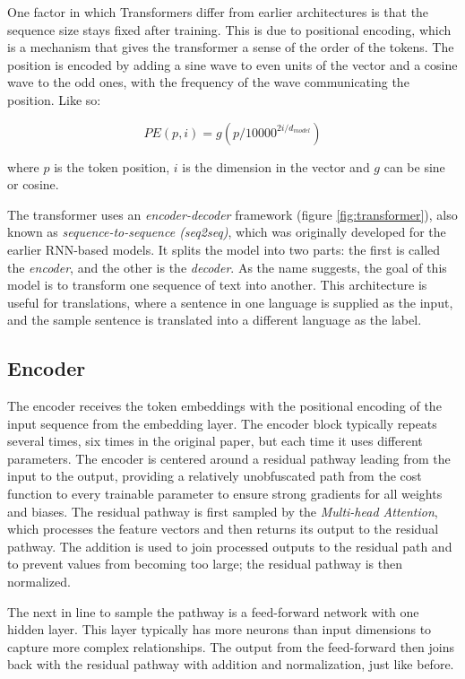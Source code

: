 One factor in which Transformers differ from earlier architectures is that the sequence size stays fixed after training. This is due to positional encoding, which is a mechanism that gives the transformer a sense of the order of the tokens. The position is encoded by adding a sine wave to even units of the vector and a cosine wave to the odd ones, with the frequency of the wave communicating the position. Like so:

\begin{equation}
PE(p,i) = g(p/10000^{{2i/d_{model}}})
\end{equation}

where $p$ is the token position, $i$ is the dimension in the vector and $g$ can be sine or cosine.

\medskip

The transformer uses an \emph{encoder-decoder} framework (figure \ref{fig:transformer}), also known as \emph{sequence-to-sequence (seq2seq)}, which was originally developed for the earlier RNN-based models. It splits the model into two parts: the first is called the \emph{encoder}, and the other is the \emph{decoder}. As the name suggests, the goal of this model is to transform one sequence of text into another. This architecture is useful for translations, where a sentence in one language is supplied as the input, and the sample sentence is translated into a different language as the label.

\subsection{Encoder}
The encoder receives the token embeddings with the positional encoding of the input sequence from the embedding layer. The encoder block typically repeats several times, six times in the original paper, but each time it uses different parameters.
\medskip
The encoder is centered around a residual pathway leading from the input to the output, providing a relatively unobfuscated path from the cost function to every trainable parameter to ensure strong gradients for all weights and biases. The residual pathway is first sampled by the \emph{Multi-head Attention}, which processes the feature vectors and then returns its output to the residual pathway. The addition is used to join processed outputs to the residual path and to prevent values from becoming too large; the residual pathway is then normalized.

The next in line to sample the pathway is a feed-forward network with one hidden layer. This layer typically has more neurons than input dimensions to capture more complex relationships. The output from the feed-forward then joins back with the residual pathway with addition and normalization, just like before.

